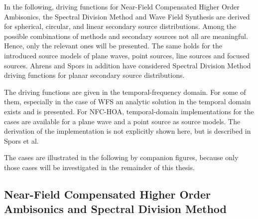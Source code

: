 In the following, driving functions for Near-Field Compensated High\-er Order
Ambisonics, the Spectral Division Method and Wave Field Synthesis are derived
for spherical, circular, and linear secondary source distributions. Among the
possible combinations of methods and secondary sources not all are
meaningful. Hence, only the relevant ones will be presented. The same holds for the
introduced source models of plane waves, point sources, line sources and focused
sources.
Ahrens and
Spors
in addition have considered Spectral Division Method driving functions for
planar secondary source distributions.

The driving functions are given in the temporal-frequency domain. For some of them,
especially in the case of \ac{WFS} an analytic solution in the temporal
domain exists and is presented. For \ac{NFC-HOA}, temporal-domain implementations
for the \twohalfD cases are available for a plane wave and a point source as source models. The
derivation of the implementation is not explicitly shown here, but is described
in Spors et al.

The \twohalfD cases are illustrated in the following by companion
figures, because only those cases will be investigated in the remainder of this
thesis.

\subsection{Near-Field Compensated Higher Order Ambisonics and Spectral Division Method}
\label{sec:driving_functions_hoa}


